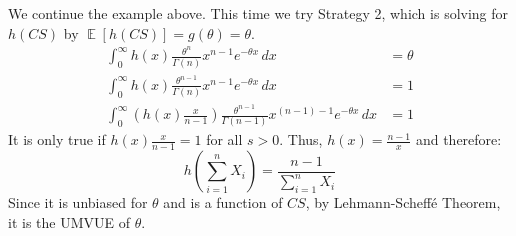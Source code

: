 \documentclass{huhtakm-template-book-v2}
\DeclareMathOperator{\E}{\mathbb{E}}
\begin{document}
\begin{eg}
	We continue the example above. This time we try Strategy 2, which is solving for $h(CS)$ by $\E[h(CS)]=g(\theta)=\theta$.
	\begin{align*}
		\int_{0}^{\infty}h(x)\frac{\theta^{n}}{\Gamma(n)}x^{n-1}e^{-\theta x}\,dx&=\theta\\
		\int_{0}^{\infty}h(x)\frac{\theta^{n-1}}{\Gamma(n)}x^{n-1}e^{-\theta x}\,dx&=1\\
		\int_{0}^{\infty}\left(h(x)\frac{x}{n-1}\right)\frac{\theta^{n-1}}{\Gamma(n-1)}x^{(n-1)-1}e^{-\theta x}\,dx&=1
	\end{align*} 
	It is only true if $h(x)\frac{x}{n-1}=1$ for all $s>0$. Thus, $h(x)=\frac{n-1}{x}$ and therefore:
	\begin{equation*}
		h\left(\sum_{i=1}^{n}X_{i}\right)=\frac{n-1}{\sum_{i=1}^{n}X_{i}}
	\end{equation*}
	Since it is unbiased for $\theta$ and is a function of $CS$, by Lehmann-Scheff\'e Theorem, it is the UMVUE of $\theta$.
\end{eg}
\end{document}
